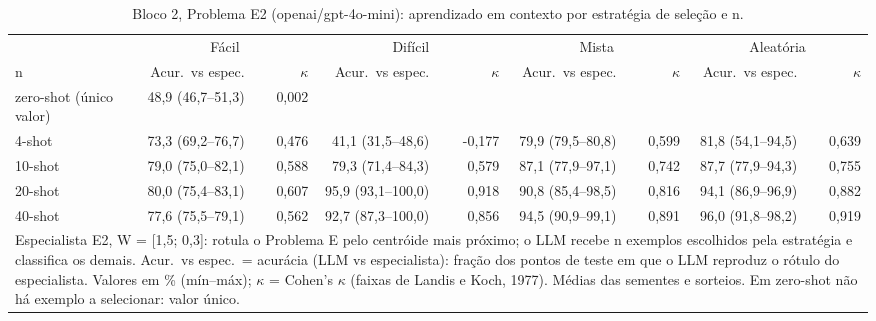 \begin{table}[htbp]
\centering
\small
\caption{Bloco 2, Problema E2 (openai/gpt-4o-mini): aprendizado em contexto por estratégia de seleção e n.}
\label{tab:bloco2_E2_faseE_estrategia_x_nshot_gpt4mini}
\begin{tabular}{lrrrrrrrr}
\toprule
 & \multicolumn{2}{c}{Fácil} & \multicolumn{2}{c}{Difícil} & \multicolumn{2}{c}{Mista} & \multicolumn{2}{c}{Aleatória} \\ \cmidrule(lr){2-3} \cmidrule(lr){4-5} \cmidrule(lr){6-7} \cmidrule(lr){8-9}
n & Acur.\ vs espec. & $\kappa$ & Acur.\ vs espec. & $\kappa$ & Acur.\ vs espec. & $\kappa$ & Acur.\ vs espec. & $\kappa$ \\
\midrule
zero-shot (único valor) & 48,9 (46,7–51,3) & 0,002 &  &  &  &  &  &  \\
4-shot & 73,3 (69,2–76,7) & 0,476 & 41,1 (31,5–48,6) & -0,177 & 79,9 (79,5–80,8) & 0,599 & 81,8 (54,1–94,5) & 0,639 \\
10-shot & 79,0 (75,0–82,1) & 0,588 & 79,3 (71,4–84,3) & 0,579 & 87,1 (77,9–97,1) & 0,742 & 87,7 (77,9–94,3) & 0,755 \\
20-shot & 80,0 (75,4–83,1) & 0,607 & 95,9 (93,1–100,0) & 0,918 & 90,8 (85,4–98,5) & 0,816 & 94,1 (86,9–96,9) & 0,882 \\
40-shot & 77,6 (75,5–79,1) & 0,562 & 92,7 (87,3–100,0) & 0,856 & 94,5 (90,9–99,1) & 0,891 & 96,0 (91,8–98,2) & 0,919 \\
\bottomrule
\multicolumn{9}{p{0.95\linewidth}}{\footnotesize Especialista E2, W = [1,5; 0,3]: rotula o Problema E pelo centróide mais próximo; o LLM recebe n exemplos escolhidos pela estratégia e classifica os demais. Acur.\ vs espec.\ = acurácia (LLM vs especialista): fração dos pontos de teste em que o LLM reproduz o rótulo do especialista. Valores em \% (mín–máx); $\kappa$ = Cohen's $\kappa$ (faixas de Landis e Koch, 1977). Médias das sementes e sorteios. Em zero-shot não há exemplo a selecionar: valor único.} \\
\end{tabular}
\end{table}
